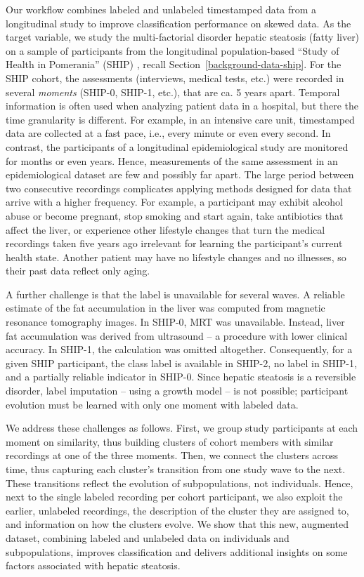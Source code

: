 \documentclass[
  oneside]{book}
\begin{document}
Our workflow combines labeled and unlabeled timestamped data from a longitudinal study to improve classification performance on skewed data.
As the target variable, we study the multi-factorial disorder hepatic steatosis (fatty liver) on a sample of participants from the longitudinal population-based ``Study of Health in Pomerania'' (SHIP) \autocite{Voelzke:SHIP11}, recall Section~\ref{background-data-ship}.
For the SHIP cohort, the assessments (interviews, medical tests, etc.) were recorded in several \emph{moments} (SHIP-0, SHIP-1, etc.), that are ca. 5 years apart.
Temporal information is often used when analyzing patient data in a hospital, but there the time granularity is different.
For example, in an intensive care unit, timestamped data are collected at a fast pace, i.e., every minute or even every second.
In contrast, the participants of a longitudinal epidemiological study are monitored for months or even years.
Hence, measurements of the same assessment in an epidemiological dataset are few and possibly far apart.
The large period between two consecutive recordings complicates applying methods designed for data that arrive with a higher frequency.
For example, a participant may exhibit alcohol abuse or become pregnant, stop smoking and start again, take antibiotics that affect the liver, or experience other lifestyle changes that turn the medical recordings taken five years ago irrelevant for learning the participant's current health state.
Another patient may have no lifestyle changes and no illnesses, so their past data reflect only aging.

A further challenge is that the label is unavailable for several waves.
A reliable estimate of the fat accumulation in the liver was computed from magnetic resonance tomography images.
In SHIP-0, MRT was unavailable.
Instead, liver fat accumulation was derived from ultrasound -- a procedure with lower clinical accuracy.
In SHIP-1, the calculation was omitted altogether.
Consequently, for a given SHIP participant, the class label is available in SHIP-2, no label in SHIP-1, and a partially reliable indicator in SHIP-0.
Since hepatic steatosis is a reversible disorder, label imputation -- using a growth model \autocite{SingerWillelt03} -- is not possible; participant evolution must be learned with only one moment with labeled data.

We address these challenges as follows.
First, we group study participants at each moment on similarity, thus building clusters of cohort members with similar recordings at one of the three moments.
Then, we connect the clusters across time, thus capturing each cluster's transition from one study wave to the next.
These transitions reflect the evolution of subpopulations, not individuals.
Hence, next to the single labeled recording per cohort participant, we also exploit the earlier, unlabeled recordings, the description of the cluster they are assigned to, and information on how the clusters evolve.
We show that this new, augmented dataset, combining labeled and unlabeled data on individuals and subpopulations, improves classification and delivers additional insights on some factors associated with hepatic steatosis.
\end{document}
